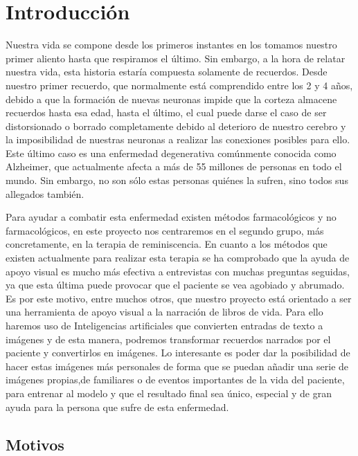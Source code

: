 \chapter{Introducción}
\label{cap:introduccion}


Nuestra vida se compone desde los primeros instantes en los tomamos nuestro primer aliento hasta que respiramos el último. Sin embargo, a la hora de relatar nuestra vida, esta historia estaría compuesta solamente de recuerdos. Desde nuestro primer recuerdo, que normalmente está comprendido entre los 2 y 4 años, debido a que la formación de nuevas neuronas impide que la corteza almacene recuerdos hasta esa edad, hasta el último, el cual puede darse el caso de ser distorsionado o borrado completamente debido al deterioro de nuestro cerebro y la imposibilidad de nuestras neuronas a realizar las conexiones posibles para ello. Este último caso es una enfermedad degenerativa comúnmente conocida como Alzheimer, que actualmente afecta a más de 55 millones de personas en todo el mundo. Sin embargo, no son sólo estas personas quiénes la sufren, sino todos sus allegados también. 


Para ayudar a combatir esta enfermedad existen métodos farmacológicos y no farmacológicos, en este proyecto nos centraremos en el segundo grupo, más concretamente, en la terapia de reminiscencia. En cuanto a los métodos que existen actualmente para realizar esta terapia se ha comprobado que la ayuda de apoyo visual es mucho más efectiva a entrevistas con muchas preguntas seguidas, ya que esta última puede provocar que el paciente se vea agobiado y abrumado. Es por este motivo, entre muchos otros, que nuestro proyecto está orientado a ser una herramienta de apoyo visual a la narración de libros de vida. Para ello haremos uso de Inteligencias artificiales que convierten entradas de texto a imágenes y de esta manera, podremos transformar recuerdos narrados por el paciente y convertirlos en imágenes. Lo interesante es poder dar la posibilidad de hacer estas imágenes más personales de forma que se puedan añadir una serie de imágenes propias,de familiares o de eventos importantes de la vida del paciente, para entrenar al modelo y que el resultado final sea único, especial y de gran ayuda para la persona que sufre de esta enfermedad. 

\section{Motivos}


